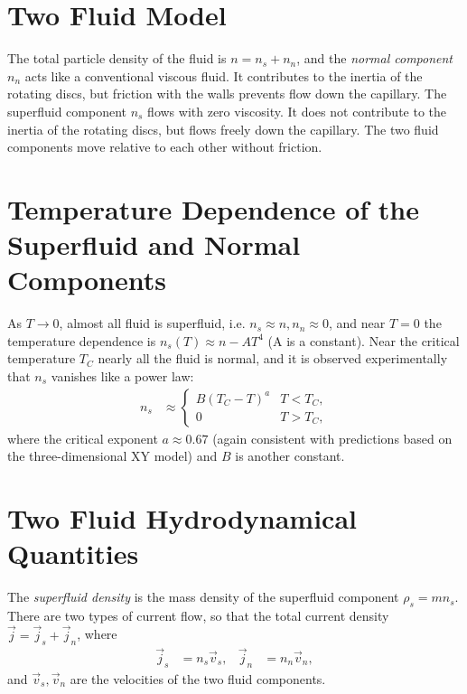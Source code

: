\documentclass[a4paper, 11pt, normalem]{report}
\begin{document}
\section{Two Fluid Model}
The total particle density of the fluid is $n=n_s+n_n$, and the \emph{normal component} $n_n$ acts like a conventional viscous fluid.
It contributes to the inertia of the rotating discs, but friction with the walls prevents flow down the capillary.
The superfluid component $n_s$ flows with zero viscosity.
It does not contribute to the inertia of the rotating discs, but flows freely down the capillary.
The two fluid components move relative to each other without friction.

\section{Temperature Dependence of the Superfluid and Normal Components}
As $T\to0$, almost all fluid is superfluid, i.e. $n_s\approx n,n_n\approx0$, and near $T=0$ the temperature dependence is $n_s(T)\approx n-AT^4$ (A is a constant).
Near the critical temperature $T_C$ nearly all the fluid is normal, and it is observed experimentally that $n_s$ vanishes like a power law:
\begin{align}
    n_s &\approx \begin{cases} B(T_C-T)^a & T<T_C, \\ 0 & T>T_C, \end{cases}
\end{align}
where the critical exponent $a\approx0.67$ (again consistent with predictions based on the three-dimensional XY model) and $B$ is another constant.

\section{Two Fluid Hydrodynamical Quantities}
The \emph{superfluid density} is the mass density of the superfluid component $\rho_s=mn_s$.
There are two types of current flow, so that the total current density $\vec{j}=\vec{j}_s+\vec{j}_n$, where
\begin{align}
    \vec{j}_s &= n_s\vec{v}_s, & \vec{j}_n &= n_n\vec{v}_n,
\end{align}
and $\vec{v}_s,\vec{v}_n$ are the velocities of the two fluid components.
\end{document}
